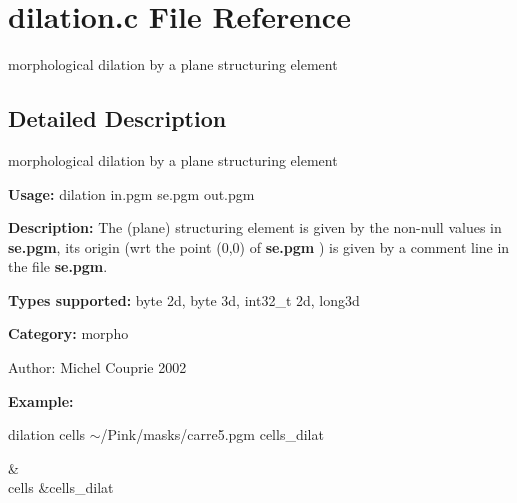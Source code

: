 \section{dilation.c File Reference}
\label{dilation_8c}
morphological dilation by a plane structuring element  




\label{_details}
\subsection{Detailed Description}
morphological dilation by a plane structuring element 

{\bf Usage:} dilation in.pgm se.pgm out.pgm

{\bf Description:} The (plane) structuring element is given by the non-null values in {\bf se.pgm}, its origin (wrt the point (0,0) of {\bf se.pgm} ) is given by a comment line in the file {\bf se.pgm}.

{\bf Types supported:} byte 2d, byte 3d, int32\_\-t 2d, long3d

{\bf Category:} morpho

\begin{Desc}
\item[Author:]Michel Couprie 2002\end{Desc}
{\bf Example:}

dilation cells $\sim$/Pink/masks/carre5.pgm cells\_\-dilat

\begin{TabularC}{2}
\hline
 &  \\
cells &cells\_\-dilat  \\
\end{TabularC}
